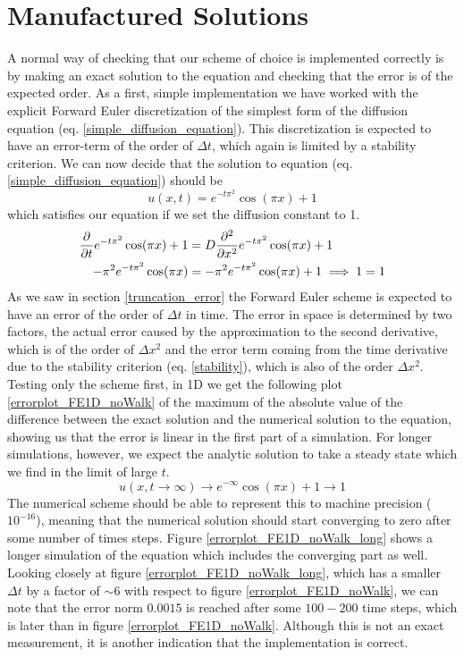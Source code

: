 \section{Manufactured Solutions}
A normal way of checking that our scheme of choice is implemented correctly is by making an exact solution to the equation and checking that the error is of the expected order. 
As a first, simple implementation we have worked with the explicit Forward Euler discretization of the simplest form of the diffusion equation (eq. \ref{simple_diffusion_equation}). 
This discretization is expected to have an error-term of the order of $\Delta t$, which again is limited by a stability criterion. 
We can now decide that the solution to equation (eq. \ref{simple_diffusion_equation}) should be
\begin{equation}\label{manifactured_solution_1D}
 u(x,t) = e^{-t\pi^2}\cos(\pi x) +1
\end{equation}
which satisfies our equation if we set the diffusion constant to 1.
\begin{align}
 \frac{\partial }{\partial t}e^{-t\pi^2}\cos(\pi x) +1 &= D\frac{\partial^2}{\partial x^2}e^{-t\pi^2}\cos(\pi x) +1\\
 -\pi^2e^{-t\pi^2}\cos(\pi x) &= -\pi^2e^{-t\pi^2}\cos(\pi x) +1 \implies 1 = 1
\end{align}
As we saw in section \ref{truncation_error} the Forward Euler scheme is expected to have an error of the order of $\Delta t$ in time. 
The error in space is determined by two factors, the actual error caused by the approximation to the second derivative, which is of the order of $\Delta x^2$ and the error term coming from the time derivative due to the stability criterion (eq. \ref{stability}), which is also of the order $\Delta x^2$. 
Testing only the scheme first, in 1D we get the following plot \ref{errorplot_FE1D_noWalk} of the maximum of the absolute value of the difference between the exact solution and the numerical solution to the equation, showing us that the error is linear in the first part of a simulation. 
For longer simulations, however, we expect the analytic solution to take a steady state which we find in the limit of large $t$. 
\begin{equation}
 u(x,t\to\infty) \to e^{-\infty}\cos(\pi x) +1 \to 1
\end{equation}
The numerical scheme should be able to represent this to machine precision ($10^{-16}$), meaning that the numerical solution should start converging to zero after some number of times steps. 
Figure \ref{errorplot_FE1D_noWalk_long} shows a longer simulation of the equation which includes the converging part as well. 
Looking closely at figure \ref{errorplot_FE1D_noWalk_long}, which has a smaller $\Delta t$ by a factor of $\sim6$ with respect to figure \ref{errorplot_FE1D_noWalk}, we can note that the error norm $0.0015$ is reached after some $100-200$ time steps, which is later than in figure \ref{errorplot_FE1D_noWalk}. 
Although this is not an exact measurement, it is another indication that the implementation is correct.

